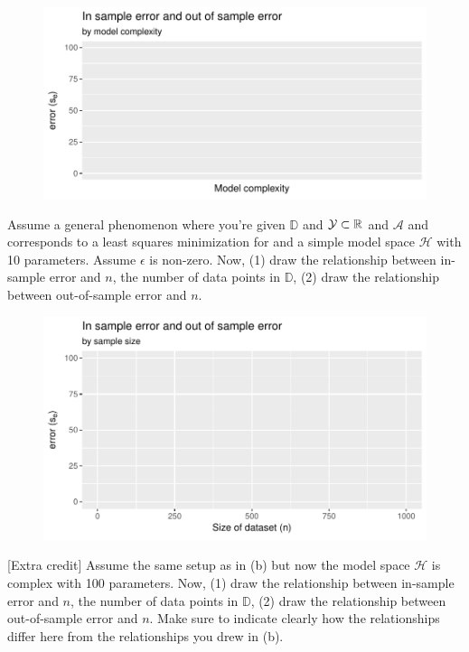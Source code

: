 \documentclass[12pt]{article}
\begin{document}
\begin{figure}[htp]
\centering
\includegraphics[width=6.5in]{complexity}
\end{figure}

\pagebreak

 Assume a general phenomenon where you're given $\mathbb{D}$ and $\mathcal{Y} \subset \mathbb{R}$ and $\mathcal{A}$ and corresponds to a least squares minimization for and a simple model space $\mathcal{H}$ with 10 parameters. Assume $\epsilon$ is non-zero. Now, (1) draw the relationship between in-sample error and $n$, the number of data points in $\mathbb{D}$, (2) draw the relationship between out-of-sample error and $n$.  


\begin{figure}[htp]
\centering
\includegraphics[width=5.35in]{n_increasing}
\end{figure}


 [Extra credit] Assume the same setup as in (b) but now the model space $\mathcal{H}$ is complex with 100 parameters. Now, (1) draw the relationship between in-sample error and $n$, the number of data points in $\mathbb{D}$, (2) draw the relationship between out-of-sample error and $n$. Make sure to indicate clearly how the relationships differ here from the relationships you drew in (b).  
\end{document}
